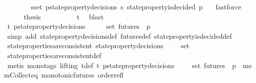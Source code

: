 \begin{isabellebody}
\ \ \ \ \ \ \isamarkupfalse%
\ {\isacartoucheopen}{\isasymforall}s{\isasymin}{\isasymsigma}{\isacharunderscore}set{\isachardot}\ {\isasymforall}p{\isasymin}state{\isacharunderscore}property{\isacharunderscore}decisions\ s{\isachardot}\ state{\isacharunderscore}property{\isacharunderscore}is{\isacharunderscore}decided\ {\isacharparenleft}p{\isacharcomma}\ {\isasymsigma}{\isacharparenright}{\isacartoucheclose}\ \isamarkupfalse%
\ fastforce\isanewline
\ \ \ \ \isamarkupfalse%
\ {\isacharquery}thesis\isanewline
\ \ \ \ \ \ \isamarkupfalse%
\ {\isacartoucheopen}{\isasymsigma}\ {\isasymin}\ {\isasymSigma}t{\isacartoucheclose}\ \isamarkupfalse%
\ blast\isanewline
\ \ \isamarkupfalse%
\isanewline
\ \ \isamarkupfalse%
\ {\isachardoublequoteopen}{\isasymexists}{\isasymsigma}{\isasymin}{\isasymSigma}t{\isachardot}\ {\isasymforall}p{\isasymin}{\isasymUnion}{\isacharbraceleft}state{\isacharunderscore}property{\isacharunderscore}decisions\ {\isasymsigma}\ {\isacharbar}\ {\isasymsigma}{\isachardot}\ {\isasymsigma}\ {\isasymin}\ {\isasymsigma}{\isacharunderscore}set{\isacharbraceright}{\isachardot}\ {\isasymforall}{\isasymsigma}{\isacharprime}{\isasymin}futures\ {\isasymsigma}{\isachardot}\ p\ {\isasymsigma}{\isacharprime}{\isachardoublequoteclose}\isanewline
\ \ \ \ \isamarkupfalse%
\ {\isacharparenleft}simp\ add{\isacharcolon}\ state{\isacharunderscore}property{\isacharunderscore}decisions{\isacharunderscore}def\ futures{\isacharunderscore}def\ state{\isacharunderscore}property{\isacharunderscore}is{\isacharunderscore}decided{\isacharunderscore}def{\isacharparenright}\isanewline
\ \ \isamarkupfalse%
\ {\isachardoublequoteopen}state{\isacharunderscore}properties{\isacharunderscore}are{\isacharunderscore}consistent\ {\isacharparenleft}{\isasymUnion}{\isacharbraceleft}state{\isacharunderscore}property{\isacharunderscore}decisions\ {\isasymsigma}\ {\isacharbar}{\isasymsigma}{\isachardot}\ {\isasymsigma}\ {\isasymin}\ {\isasymsigma}{\isacharunderscore}set{\isacharbraceright}{\isacharparenright}{\isachardoublequoteclose}\isanewline
\ \ \ \ \isamarkupfalse%
\ state{\isacharunderscore}properties{\isacharunderscore}are{\isacharunderscore}consistent{\isacharunderscore}def\ \isanewline
\ \ \ \ \isamarkupfalse%
\ {\isacharparenleft}metis\ {\isacharparenleft}mono{\isacharunderscore}tags{\isacharcomma}\ lifting{\isacharparenright}\ {\isasymSigma}t{\isacharunderscore}def\ {\isacartoucheopen}{\isasymexists}{\isasymsigma}{\isasymin}{\isasymSigma}t{\isachardot}\ {\isasymforall}p{\isasymin}{\isasymUnion}{\isacharbraceleft}state{\isacharunderscore}property{\isacharunderscore}decisions\ {\isasymsigma}\ {\isacharbar}{\isasymsigma}{\isachardot}\ {\isasymsigma}\ {\isasymin}\ {\isasymsigma}{\isacharunderscore}set{\isacharbraceright}{\isachardot}\ {\isasymforall}{\isasymsigma}{\isacharprime}{\isasymin}futures\ {\isasymsigma}{\isachardot}\ p\ {\isasymsigma}{\isacharprime}{\isacartoucheclose}\ mem{\isacharunderscore}Collect{\isacharunderscore}eq\ monotonic{\isacharunderscore}futures\ order{\isacharunderscore}refl{\isacharparenright}\isanewline

\end{isabellebody}
